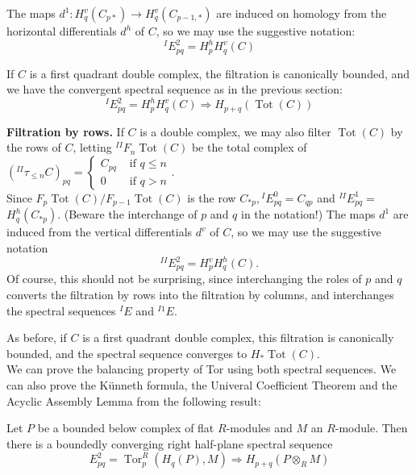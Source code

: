 \begin{example}
The maps $d^1: H_q^v\left(C_{p *}\right) \rightarrow H_q^v\left(C_{p-1, *}\right)$ are induced on homology from the horizontal differentials $d^h$ of $C$, so we may use the suggestive notation:
$$
{}^I E_{p q}^2=H_p^h H_q^v(C)
$$

If $C$ is a first quadrant double complex, the filtration is canonically bounded, and we have the convergent spectral sequence as in the previous section:
$$
{ }^I E_{p q}^2=H_p^h H_q^v(C) \Rightarrow H_{p+q}(\operatorname{Tot}(C))
$$

\textbf{Filtration by rows.} If $C$ is a double complex, we may also filter $\operatorname{Tot}(C)$ by the rows of $C$, letting ${ }^{I I} F_n \operatorname{Tot}(C)$ be the total complex of $\left({ }^{I I} \tau_{\leq n} C\right)_{p q}= \begin{cases}C_{p q} & \text { if } q \leq n \\ 0 & \text { if } q>n\end{cases}$. \\
Since $F_p \operatorname{Tot}(C) / F_{p-1} \operatorname{Tot}(C)$ is the row $C_{* p},{ }^I E_{p q}^0=C_{q p}$ and ${ }^{I I} E_{p q}^1=$ $H_q^h\left(C_{* p}\right)$. (Beware the interchange of $p$ and $q$ in the notation!) The maps $d^1$ are induced from the vertical differentials $d^v$ of $C$, so we may use the suggestive notation $$ {}^{II} E^2_{pq} = H^v _p H^h _q (C) .$$
Of course, this should not be surprising, since interchanging the roles of $p$ and $q$ converts the filtration by rows into the filtration by columns, and interchanges the spectral sequences ${ }^I E$ and ${ }^{I 1} E$.

As before, if $C$ is a first quadrant double complex, this filtration is canonically bounded, and the spectral sequence converges to $H_* \operatorname{Tot}(C)$.\\

We can prove the balancing property of Tor using both spectral sequences. We can also prove the Künneth formula, the Univeral Coefficient Theorem and the Acyclic Assembly Lemma from the following result:

\begin{theo}
Let $P$ be a bounded below complex of flat $R$-modules and $M$ an $R$-module. Then there is a boundedly converging right half-plane spectral sequence
    $$
    E_{p q}^2=\operatorname{Tor}_p^R\left(H_q(P), M\right) \Rightarrow H_{p+q}\left(P \otimes_R M\right)
    $$    
\end{theo}


\end{example}
